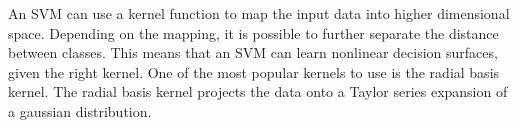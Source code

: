 An SVM can use a kernel function to map the input data into higher dimensional space. Depending on the mapping, it is possible to further separate the distance between classes. This means that an SVM can learn nonlinear decision surfaces, given the right kernel. One of the most popular kernels to use is the radial basis kernel. The radial basis kernel projects the data onto a Taylor series expansion of a gaussian distribution.
